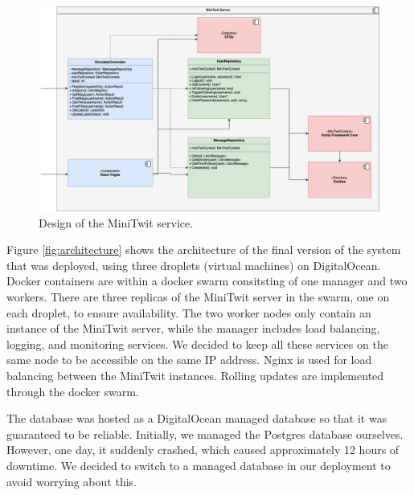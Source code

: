 \begin{figure}[H]
    \centering
    \includegraphics[width=\textwidth]{images/miniTwitServerOverview.png}
    \caption{Design of the MiniTwit service.}
    \label{fig:miniTwitApiOverview}
\end{figure}

Figure \ref{fig:architecture} shows the architecture of the final version of the system that was deployed, using three droplets (virtual machines) on DigitalOcean. Docker containers are within a docker swarm consitsting of one manager and two workers. There are three replicas of the MiniTwit server in the swarm, one on each droplet, to ensure availability. The two worker nodes only contain an instance of the MiniTwit server, while the manager includes load balancing, logging, and monitoring services. We decided to keep all these services on the same node to be accessible on the same IP address. Nginx is used for load balancing between the MiniTwit instances. Rolling updates are implemented through the docker swarm.

The database was hosted as a DigitalOcean managed database so that it was guaranteed to be reliable. Initially, we managed the Postgres database ourselves. However, one day, it suddenly crashed, which caused approximately 12 hours of downtime. We decided to switch to a managed database in our deployment to avoid worrying about this.


